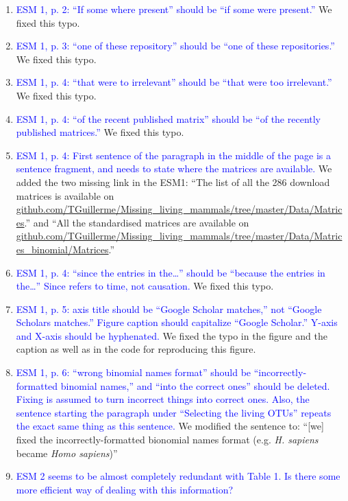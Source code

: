 \documentclass[12pt,letterpaper]{article}
\begin{document}
\begin{enumerate}
\item{\textcolor{blue}{ESM 1, p. 2: ``If some where present'' should be ``if some were present.''}}
We fixed this typo.

\item{\textcolor{blue}{ESM 1, p. 3: ``one of these repository'' should be ``one of these repositories.''}}
We fixed this typo.

\item{\textcolor{blue}{ESM 1, p. 4: ``that were to irrelevant'' should be ``that were too irrelevant.''}}
We fixed this typo.

\item{\textcolor{blue}{ESM 1, p. 4: ``of the recent published matrix'' should be ``of the recently published matrices.''}}
We fixed this typo.

\item{\textcolor{blue}{ESM 1, p. 4: First sentence of the paragraph in the middle of the page is a sentence fragment, and needs to state where the matrices are available.}}
We added the two missing link in the ESM1: ``The list of all the 286 download matrices is available on \url{github.com/TGuillerme/Missing_living_mammals/tree/master/Data/Matrices}.'' and ``All the standardised matrices are available on \url{github.com/TGuillerme/Missing_living_mammals/tree/master/Data/Matrices_binomial/Matrices}.''

\item{\textcolor{blue}{ESM 1, p. 4: ``since the entries in the…'' should be ``because the entries in the…'' Since refers to time, not causation.}}
We fixed this typo.

\item{\textcolor{blue}{ESM 1, p. 5: axis title should be ``Google Scholar matches,'' not ``Google Scholars matches.'' Figure caption should capitalize ``Google Scholar.'' Y-axis and X-axis should be hyphenated.}}
We fixed the typo in the figure and the caption as well as in the code for reproducing this figure.

\item{\textcolor{blue}{ESM 1, p. 6: ``wrong binomial names format'' should be ``incorrectly-formatted binomial names,'' and ``into the correct ones'' should be deleted.
Fixing is assumed to turn incorrect things into correct ones.
Also, the sentence starting the paragraph under ``Selecting the living OTUs'' repeats the exact same thing as this sentence.}}
We modified the sentence to: ``[we] fixed the incorrectly-formatted bionomial names format (e.g. \textit{H. sapiens} became \textit{Homo sapiens})''

\item{\textcolor{blue}{ESM 2 seems to be almost completely redundant with Table 1. Is there some more efficient way of dealing with this information?}}


\end{enumerate}
\end{document}

